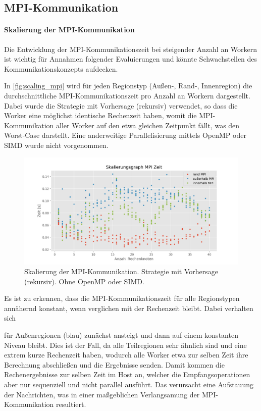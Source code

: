 \subsection{MPI-Kommunikation}

\paragraph{Skalierung der MPI-Kommunikation}
Die Entwicklung der MPI-Kommunikationszeit bei steigender Anzahl an Workern ist wichtig für Annahmen folgender Evaluierungen und 
könnte Schwachstellen des Kommunikationskonzepts aufdecken.

In \autoref{fig:scaling_mpi} wird für jeden Regionstyp (Außen-, Rand-, Innenregion) die durchschnittliche MPI-Kommunikationszeit 
pro Anzahl an Workern dargestellt. Dabei wurde die Strategie mit Vorhersage (rekursiv) verwendet, 
so dass die Worker eine möglichst identische Rechenzeit haben, womit die MPI-Kommunikation aller Worker 
auf den etwa gleichen Zeitpunkt fällt, was den Worst-Case darstellt. 
Eine anderweitige Parallelisierung mittels OpenMP oder SIMD wurde nicht vorgenommen.
\begin{figure}[h!]
	\centering
	\includegraphics[width=0.9\linewidth]{img/Evaluation/scaling_mpi.png}
	\caption{Skalierung der MPI-Kommunikation. Strategie mit Vorhersage (rekursiv). Ohne OpenMP oder SIMD.}
	\label{fig:scaling_mpi}
\end{figure}
Es ist zu erkennen, dass die MPI-Kommunikationszeit für alle Regionstypen annähernd konstant, wenn verglichen mit der Rechenzeit bleibt.
Dabei verhalten sich


für Außenregionen (blau) zunächst ansteigt und dann auf einem konstanten Niveau bleibt.
Dies ist der Fall, da alle Teilregionen sehr ähnlich sind und eine extrem kurze Rechenzeit haben, wodurch alle Worker etwa zur selben Zeit ihre Berechnung abschließen und die Ergebnisse senden. 
Damit kommen die Rechenergebnisse zur selben Zeit im Host an, 
welcher die Empfangsoperationen aber nur sequenziell und nicht parallel ausführt. 
Das verursacht eine Aufstauung der Nachrichten, was in einer maßgeblichen Verlangsamung der MPI-Kommunikation resultiert.

